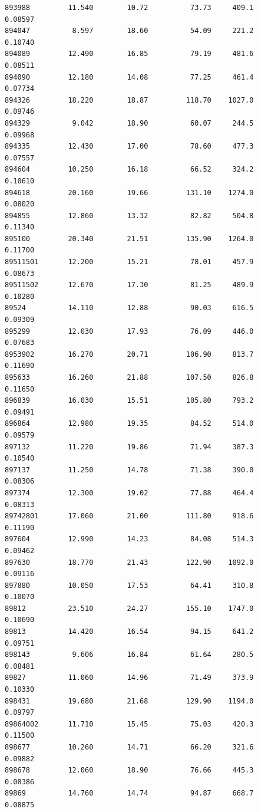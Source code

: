 \documentclass[
  letterpaper,
  DIV=11,
  numbers=noendperiod]{scrartcl}
\begin{document}
\begin{verbatim}
893988         11.540        10.72          73.73     409.1         0.08597
894047          8.597        18.60          54.09     221.2         0.10740
894089         12.490        16.85          79.19     481.6         0.08511
894090         12.180        14.08          77.25     461.4         0.07734
894326         18.220        18.87         118.70    1027.0         0.09746
894329          9.042        18.90          60.07     244.5         0.09968
894335         12.430        17.00          78.60     477.3         0.07557
894604         10.250        16.18          66.52     324.2         0.10610
894618         20.160        19.66         131.10    1274.0         0.08020
894855         12.860        13.32          82.82     504.8         0.11340
895100         20.340        21.51         135.90    1264.0         0.11700
89511501       12.200        15.21          78.01     457.9         0.08673
89511502       12.670        17.30          81.25     489.9         0.10280
89524          14.110        12.88          90.03     616.5         0.09309
895299         12.030        17.93          76.09     446.0         0.07683
8953902        16.270        20.71         106.90     813.7         0.11690
895633         16.260        21.88         107.50     826.8         0.11650
896839         16.030        15.51         105.80     793.2         0.09491
896864         12.980        19.35          84.52     514.0         0.09579
897132         11.220        19.86          71.94     387.3         0.10540
897137         11.250        14.78          71.38     390.0         0.08306
897374         12.300        19.02          77.88     464.4         0.08313
89742801       17.060        21.00         111.80     918.6         0.11190
897604         12.990        14.23          84.08     514.3         0.09462
897630         18.770        21.43         122.90    1092.0         0.09116
897880         10.050        17.53          64.41     310.8         0.10070
89812          23.510        24.27         155.10    1747.0         0.10690
89813          14.420        16.54          94.15     641.2         0.09751
898143          9.606        16.84          61.64     280.5         0.08481
89827          11.060        14.96          71.49     373.9         0.10330
898431         19.680        21.68         129.90    1194.0         0.09797
89864002       11.710        15.45          75.03     420.3         0.11500
898677         10.260        14.71          66.20     321.6         0.09882
898678         12.060        18.90          76.66     445.3         0.08386
89869          14.760        14.74          94.87     668.7         0.08875

\end{verbatim}
\end{document}
